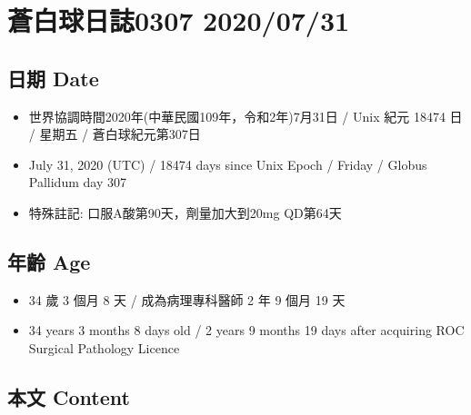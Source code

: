 \documentclass[a5paper, 11pt
]{book}
\providecommand{\tightlist}{%
  \setlength{\itemsep}{0pt}\setlength{\parskip}{0pt}}
\begin{document}
\hypertarget{ux84bcux767dux7403ux65e5ux8a8c0307-20200731}{%
\section{蒼白球日誌0307
2020/07/31}\label{ux84bcux767dux7403ux65e5ux8a8c0307-20200731}}

\hypertarget{ux65e5ux671f-date-60}{%
\subsection{日期 Date}\label{ux65e5ux671f-date-60}}

\begin{itemize}
\tightlist
\item
  世界協調時間2020年(中華民國109年，令和2年)7月31日 / Unix 紀元 18474 日
  / 星期五 / 蒼白球紀元第307日
\item
  July 31, 2020 (UTC) / 18474 days since Unix Epoch / Friday / Globus
  Pallidum day 307
\item
  特殊註記: 口服A酸第90天，劑量加大到20mg QD第64天
\end{itemize}

\hypertarget{ux5e74ux9f61-age-60}{%
\subsection{年齡 Age}\label{ux5e74ux9f61-age-60}}

\begin{itemize}
\tightlist
\item
  34 歲 3 個月 8 天 / 成為病理專科醫師 2 年 9 個月 19 天
\item
  34 years 3 months 8 days old / 2 years 9 months 19 days after
  acquiring ROC Surgical Pathology Licence
\end{itemize}

\hypertarget{ux672cux6587-content-60}{%
\subsection{本文 Content}\label{ux672cux6587-content-60}}
\end{document}
